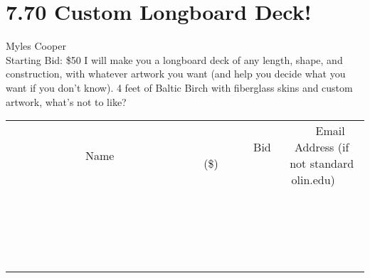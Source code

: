 \documentclass[11pt]{article}
\begin{document}
\section*{7.70 Custom Longboard Deck!}
Myles Cooper
\\
Starting Bid: \$50
\newline
I will make you a longboard deck of any length, shape, and construction, with whatever artwork you want (and help you decide what you want if you don't know). 4 feet of Baltic Birch with fiberglass skins and custom artwork, what's not to like?
\\[3ex]
\begin{tabular}{c c c}
~~~~~~~~~~~~~Name~~~~~~~~~~~~~ & ~~~~~~~~~Bid (\$)~~~~~~~~~  & ~~~Email Address (if not standard olin.edu)~~~\\
 & & \\
\hline
 & & \\
\hline
 & & \\
\hline
 & & \\
\hline
 & & \\
\hline
 & & \\
\hline
 & & \\
\hline
 & & \\
\hline
 & & \\
\hline
 & & \\
\hline
 & & \\
\hline
 & & \\
\hline
 & & \\
\hline
 & & \\
\hline
 & & \\
\hline
 & & \\
\hline
 & & \\
\hline
 & & \\
\hline
 & & \\
\hline
\end{tabular}
\newpage
\end{document}
